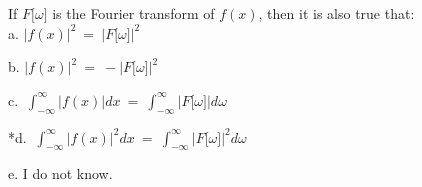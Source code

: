 
If \(F\lbrack\omega\rbrack\) is the Fourier transform of \(f(x)\), then it is also true that: \\

a. \(|f(x)|^{2}\  = \ |F\lbrack\omega\rbrack|^{2}\)

b. \(|f(x)|^{2}\  = \  - |F\lbrack\omega\rbrack|^{2}\)

c. \(\ \int_{- \infty}^{\infty } |f(x)|dx\  = \ \int_{- \infty}^{\infty } |F\lbrack\omega\rbrack{|d\omega}^{}\)

*d. \(\ \int_{- \infty}^{\infty } |f(x)|^{2}dx\  = \ \int_{- \infty}^{\infty } |F\lbrack\omega\rbrack{|^{2}d\omega}^{}\)

e. I do not know. \\
